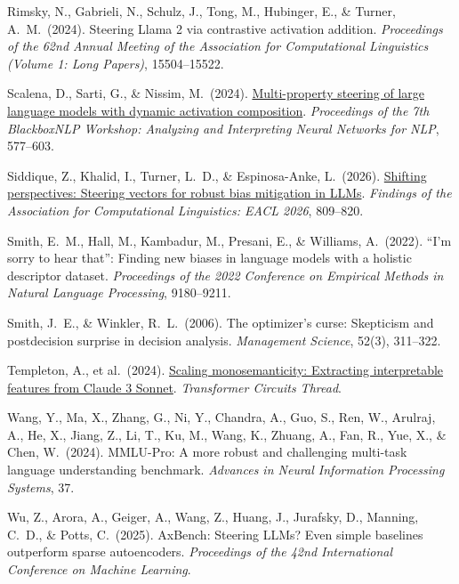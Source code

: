 \documentclass{article}
\begin{document}
{Rimsky, N., Gabrieli, N., Schulz, J., Tong, M., Hubinger, E., \& Turner, A.\ M.\ (2024). Steering Llama 2 via contrastive activation addition. {\it Proceedings of the 62nd Annual Meeting of the Association for Computational Linguistics (Volume 1: Long Papers)}, 15504--15522.

Scalena, D., Sarti, G., \& Nissim, M.\ (2024). \href{https://aclanthology.org/2024.blackboxnlp-1.34/}{Multi-property steering of large language models with dynamic activation composition}. {\it Proceedings of the 7th BlackboxNLP Workshop: Analyzing and Interpreting Neural Networks for NLP}, 577--603.

Siddique, Z., Khalid, I., Turner, L.\ D., \& Espinosa-Anke, L.\ (2026). \href{https://aclanthology.org/2026.findings-eacl.41/}{Shifting perspectives: Steering vectors for robust bias mitigation in LLMs}. {\it Findings of the Association for Computational Linguistics: EACL 2026}, 809--820.

Smith, E.\ M., Hall, M., Kambadur, M., Presani, E., \& Williams, A.\ (2022). ``I'm sorry to hear that'': Finding new biases in language models with a holistic descriptor dataset. {\it Proceedings of the 2022 Conference on Empirical Methods in Natural Language Processing}, 9180--9211.

Smith, J.\ E., \& Winkler, R.\ L.\ (2006). The optimizer's curse: Skepticism and postdecision surprise in decision analysis. {\it Management Science}, 52(3), 311--322.

Templeton, A., et al.\ (2024). \href{https://transformer-circuits.pub/2024/scaling-monosemanticity/index.html}{Scaling monosemanticity: Extracting interpretable features from Claude 3 Sonnet}. {\it Transformer Circuits Thread}.

Wang, Y., Ma, X., Zhang, G., Ni, Y., Chandra, A., Guo, S., Ren, W., Arulraj, A., He, X., Jiang, Z., Li, T., Ku, M., Wang, K., Zhuang, A., Fan, R., Yue, X., \& Chen, W.\ (2024). MMLU-Pro: A more robust and challenging multi-task language understanding benchmark. {\it Advances in Neural Information Processing Systems}, 37.

Wu, Z., Arora, A., Geiger, A., Wang, Z., Huang, J., Jurafsky, D., Manning, C.\ D., \& Potts, C.\ (2025). AxBench: Steering LLMs? Even simple baselines outperform sparse autoencoders. {\it Proceedings of the 42nd International Conference on Machine Learning}.

}


\end{document}
